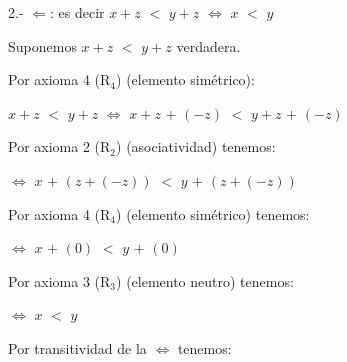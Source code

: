 \documentclass[12pt]{article}
\begin{document}

{\textcolor{onyx}{2.-}} {} {\textcolor{pakistangreen}{{\Large{$\Longleftarrow$}}}}: es decir {\Large{$x+z$ $<$ $y+z$ $\Longleftrightarrow$ $x$ $<$ $y$}} \vspace{0.5cm}
 
 {} \vspace{0.5cm} 

Suponemos {\Large{$x+z$ $<$ $y+z$}} {\textcolor{pakistangreen}{verdadera.}} \vspace{0.5cm}

{\textcolor{carrotorange}{Por axioma 4 (R$_4$)}} {({\textcolor{pakistangreen}{elemento simétrico}})}:\vspace{0.5cm}

\hspace{2.3cm} $x+z$ $<$ $y+z$ $\Longleftrightarrow$ $x+z$ $+$ $(-z)$ $<$ $y+z$ $+$ $(-z)$\vspace{0.5cm}

{\textcolor{carrotorange}{Por axioma 2 (R$_2$)}} {({\textcolor{pakistangreen}{asociatividad}})} tenemos: \vspace{0.5cm}

\hspace{5.4cm} $\Longleftrightarrow$ $x$ $+$ $(z+(-z))$ $<$ $y$ $+$ $(z+(-z))$\vspace{0.5cm}

{\textcolor{carrotorange}{Por axioma 4 (R$_4$)}} {({\textcolor{pakistangreen}{elemento simétrico}})} tenemos: \vspace{0.5cm}

\hspace{5.4cm} $\Longleftrightarrow$ $x$ $+$ $(0)$ $<$ $y$ $+$ $(0)$ \vspace{0.5cm}

{\textcolor{carrotorange}{Por axioma 3 (R$_3$)}} {({\textcolor{pakistangreen}{elemento neutro}})} tenemos: \vspace{0.5cm}

\hspace{5.4cm} $\Longleftrightarrow$ $x$ $<$ $y$ \vspace{0.5cm}

{\textcolor{carrotorange}{Por transitividad de la}} {\textcolor{vividviolet}{{\Large{$\Longleftrightarrow$}}}} tenemos:  \vspace{0.5cm}
\end{document}
